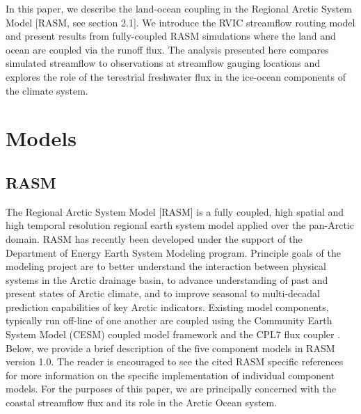 \documentclass[ms, draft]{agutex}
\begin{document}
\begin{article}
In this paper, we describe the land-ocean coupling in the Regional Arctic System Model [RASM, see section 2.1].
We introduce the RVIC streamflow routing model and present results from fully-coupled RASM simulations where the land and ocean are coupled via the runoff flux.
The analysis presented here compares simulated streamflow to observations at streamflow gauging locations and explores the role of the terestrial freshwater flux in the ice-ocean components of the climate system.

\section{Models}

\subsection{RASM}

The Regional Arctic System Model [RASM] is a fully coupled, high spatial and high temporal resolution regional earth system model applied over the pan-Arctic domain.
RASM has recently been developed under the support of the Department of Energy Earth System Modeling program.
Principle goals of the modeling project are to better understand the interaction between physical systems in the Arctic drainage basin, to advance understanding of past and present states of Arctic climate, and to improve seasonal to multi-decadal prediction capabilities of key Arctic indicators.
Existing model components, typically run off-line of one another are coupled using the Community Earth System Model (CESM) coupled model framework and the CPL7 flux coupler \citep{Craig_2011}.
Below, we provide a brief description of the five component models in RASM version 1.0.
The reader is encouraged to see the cited RASM specific references for more information on the specific implementation of individual component models.
For the purposes of this paper, we are principally concerned with the coastal streamflow flux and its role in the Arctic Ocean system.


\end{article}
\end{document}
